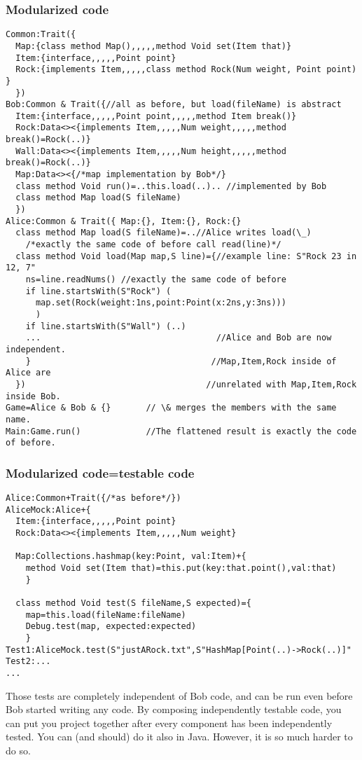 \begin{frame}[fragile]
\frametitle{Modularized code}
\begin{NiceCode}{59ex}{0.7}
\begin{lstlisting}
Common:Trait({
  Map:{class method Map(),,,,,method Void set(Item that)}
  Item:{interface,,,,,Point point}
  Rock:{implements Item,,,,,class method Rock(Num weight, Point point) }
  })
Bob:Common & Trait({//all as before, but load(fileName) is abstract
  Item:{interface,,,,,Point point,,,,,method Item break()}
  Rock:Data<><{implements Item,,,,,Num weight,,,,,method break()=Rock(..)}
  Wall:Data<><{implements Item,,,,,Num height,,,,,method break()=Rock(..)}
  Map:Data<><{/*map implementation by Bob*/}
  class method Void run()=..this.load(..).. //implemented by Bob
  class method Map load(S fileName)
  })
Alice:Common & Trait({ Map:{}, Item:{}, Rock:{}
  class method Map load(S fileName)=..//Alice writes load(\_)
    /*exactly the same code of before call read(line)*/
  class method Void load(Map map,S line)={//example line: S"Rock 23 in 12, 7"
    ns=line.readNums() //exactly the same code of before
    if line.startsWith(S"Rock") (
      map.set(Rock(weight:1ns,point:Point(x:2ns,y:3ns)))
      )
    if line.startsWith(S"Wall") (..)
    ...                                   //Alice and Bob are now independent.
    }                                    //Map,Item,Rock inside of Alice are
  })                                    //unrelated with Map,Item,Rock inside Bob.
Game=Alice & Bob & {}       // \& merges the members with the same name.
Main:Game.run()             //The flattened result is exactly the code of before.
\end{lstlisting}
\end{NiceCode}
\end{frame}

\begin{frame}[fragile]
\frametitle{Modularized code=testable code}
\begin{NiceCode}{59ex}{0.7}
\begin{lstlisting}
Alice:Common+Trait({/*as before*/})
AliceMock:Alice+{
  Item:{interface,,,,,Point point}
  Rock:Data<><{implements Item,,,,,Num weight}

  Map:Collections.hashmap(key:Point, val:Item)+{
    method Void set(Item that)=this.put(key:that.point(),val:that)
    }

  class method Void test(S fileName,S expected)={
    map=this.load(fileName:fileName)
    Debug.test(map, expected:expected)
    }
Test1:AliceMock.test(S"justARock.txt",S"HashMap[Point(..)->Rock(..)]"
Test2:...
...
\end{lstlisting}
\end{NiceCode}
Those tests are completely independent of Bob code, and can be run even before
Bob started writing any code.
By composing independently testable code, you can put you project together
after every component has been independently tested.
You can (and should) do it also in Java.
However, it is so much harder to do so.
\end{frame}


